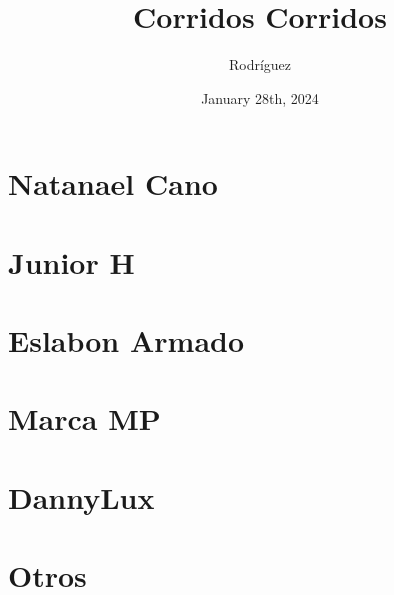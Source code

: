 \documentclass{article}
\title{Corridos Corridos}
\date{January 28th, 2024}
\author{Rodr\'iguez}
\begin{document}
\maketitle{}
\tableofcontents

\renewcommand\guitarPreAccord{\color{amaranth}\footnotesize\strut\bfseries}

%
\newpage
\section{Natanael Cano}













\section{Junior H}






\section{Eslabon Armado}





\section{Marca MP}


\section{DannyLux}


\section{Otros}





\end{document}
